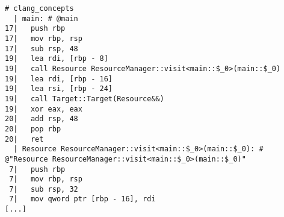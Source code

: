 \begin{lstlisting}[language={},numbers=none,title=\href{https://godbolt.org/z/3Bz1yV}{\texttt{godbolt.org/z/3Bz1yV}}]
# clang_concepts 
  | main: # @main
17|   push rbp
17|   mov rbp, rsp
17|   sub rsp, 48
19|   lea rdi, [rbp - 8]
19|   call Resource ResourceManager::visit<main::$_0>(main::$_0)
19|   lea rdi, [rbp - 16]
19|   lea rsi, [rbp - 24]
19|   call Target::Target(Resource&&)
19|   xor eax, eax
20|   add rsp, 48
20|   pop rbp
20|   ret
  | Resource ResourceManager::visit<main::$_0>(main::$_0): # @"Resource ResourceManager::visit<main::$_0>(main::$_0)"
 7|   push rbp
 7|   mov rbp, rsp
 7|   sub rsp, 32
 7|   mov qword ptr [rbp - 16], rdi
[...]
\end{lstlisting}
